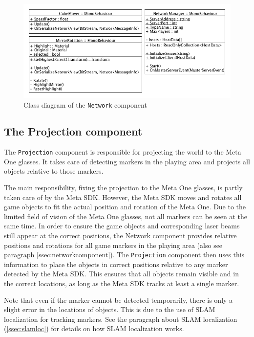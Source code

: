 			\begin{figure}[ht]
				\includegraphics[width=\textwidth]{ClassDiagramNetwork}
				\caption{Class diagram of the \texttt{Network} component}
				\label{fig:classdiagramnetwork}
			\end{figure}
			
		\subsection{The Projection component} \label{ssec:projectioncomponent}
			The \texttt{Projection} component is responsible for projecting the 
			world to the Meta One glasses. It takes care of detecting 
			markers in the playing area and projects all objects relative
			to those markers. 
			
			The main responsibility, fixing the projection to the Meta One 
			glasses, is partly taken care of by the Meta SDK. However, the 
			Meta SDK moves and rotates all game objects to fit the actual 
			position and rotation of the Meta One. Due to the limited field 
			of vision of the Meta One glasses, not all markers can be seen at 
			the same time. In order to ensure the game objects and 
			corresponding laser beams still appear at the correct positions,
			the Network component provides relative positions and rotations for 
			all game markers in the playing area (also see paragraph 
			\ref{ssec:networkcomponent}). The \texttt{Projection} component then uses
			this information to place the objects in correct positions relative
			to any marker detected by the Meta SDK. This ensures that all objects
			remain visible and in the correct locations, as long as the Meta SDK 
			tracks at least a single marker.
			
			Note that even if the marker cannot be detected temporarily, there 
			is only a slight error in the locations of objects. This is due to 
			the use of SLAM localization for tracking markers. See the paragraph
			about SLAM localization (\ref{ssec:slamloc}) for details on how SLAM 
			localization works.
			
